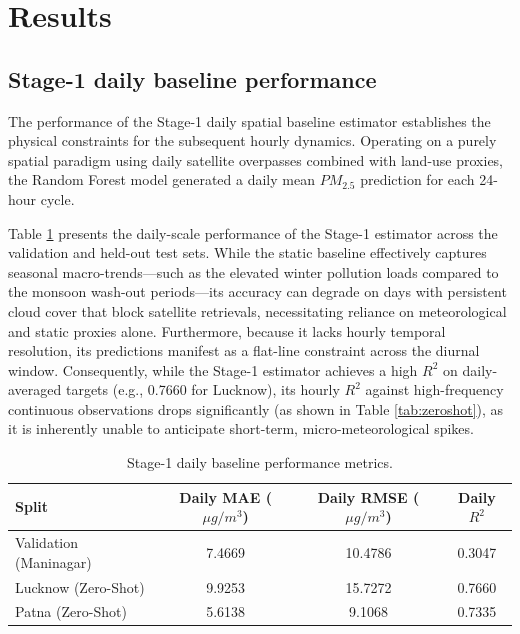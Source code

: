 \section{Results}

\subsection{Stage-1 daily baseline performance}
The performance of the Stage-1 daily spatial baseline estimator establishes the physical constraints for the subsequent hourly dynamics. Operating on a purely spatial paradigm using daily satellite overpasses combined with land-use proxies, the Random Forest model generated a daily mean $PM_{2.5}$ prediction for each 24-hour cycle. 

Table \ref{tab:stage1} presents the daily-scale performance of the Stage-1 estimator across the validation and held-out test sets. While the static baseline effectively captures seasonal macro-trends—such as the elevated winter pollution loads compared to the monsoon wash-out periods—its accuracy can degrade on days with persistent cloud cover that block satellite retrievals, necessitating reliance on meteorological and static proxies alone. Furthermore, because it lacks hourly temporal resolution, its predictions manifest as a flat-line constraint across the diurnal window. Consequently, while the Stage-1 estimator achieves a high $R^2$ on daily-averaged targets (e.g., 0.7660 for Lucknow), its hourly $R^2$ against high-frequency continuous observations drops significantly (as shown in Table \ref{tab:zeroshot}), as it is inherently unable to anticipate short-term, micro-meteorological spikes.

\begin{table}[h]
\centering
\caption{Stage-1 daily baseline performance metrics.}
\label{tab:stage1}
\begin{tabular}{lccc}
\toprule
\textbf{Split} & \textbf{Daily MAE ($\mu g/m^3$)} & \textbf{Daily RMSE ($\mu g/m^3$)} & \textbf{Daily $R^2$} \\
\midrule
Validation (Maninagar) & 7.4669 & 10.4786 & 0.3047 \\
Lucknow (Zero-Shot) & 9.9253 & 15.7272 & 0.7660 \\
Patna (Zero-Shot) & 5.6138 & 9.1068 & 0.7335 \\
\bottomrule
\end{tabular}
\end{table}

